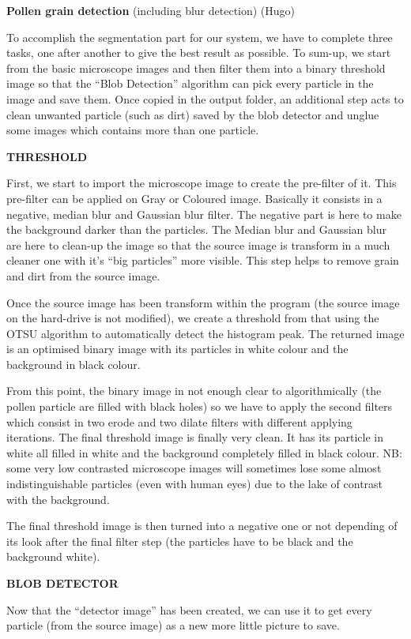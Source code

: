 \textbf{Pollen grain detection} (including blur detection) (Hugo)

To accomplish the segmentation part for our system, we have to complete three tasks, one after another to give the best result as possible.
	To sum-up, we start from the basic microscope images and then filter them into a binary threshold image so that the “Blob Detection” algorithm can pick every particle in the image and save them. Once copied in the output folder, an additional step acts to clean unwanted particle (such as dirt) saved by the blob detector and unglue some images which contains more than one particle.

\textbf{THRESHOLD}

First, we start to import the microscope image to create the pre-filter of it. This pre-filter can be applied on Gray or Coloured image. Basically it consists in a negative, median blur and Gaussian blur filter. The negative part is here to make the background darker than the particles. The Median blur and Gaussian blur are here to clean-up the image so that the source image is transform in a much cleaner one with it's “big particles” more visible. This step helps to remove grain and dirt from the source image.
	
	Once the source image has been transform within the program (the source image on the hard-drive is not modified), we create a threshold from that using the OTSU algorithm to automatically detect the histogram peak. The returned image is an optimised binary image with its particles in white colour and the background in black colour.
	
	From this point, the binary image in not enough clear to algorithmically (the pollen particle are filled with black holes) so we have to apply the second filters which consist in two erode and two dilate filters with different applying iterations. The final threshold image is finally very clean. It has its particle in white all filled in white and the background completely filled in black colour. NB: some very low contrasted microscope images will sometimes lose some almost indistinguishable particles (even with human eyes) due to the lake of contrast with the background.
	
	The final threshold image is then turned into a negative one or not depending of its look after the final filter step (the particles have to be black and the background white).

\textbf{BLOB DETECTOR}

	Now that the “detector image” has been created, we can use it to get every particle (from the source image) as a new more little picture to save.
	
